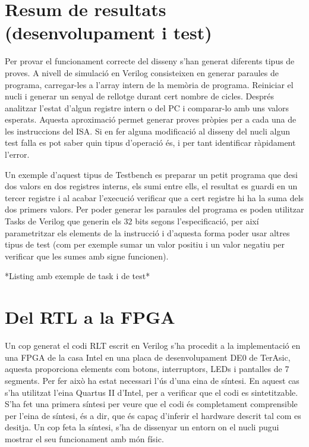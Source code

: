 \documentclass[10pt,a4paper,twocolumn,twoside]{article}
\begin{document}
    
        
        


\section{Resum de resultats (desenvolupament i test)}

Per provar el funcionament correcte del disseny s'han generat diferents tipus de proves.
A nivell de simulació en Verilog consisteixen en generar paraules de programa, carregar-les a l'array intern de la memòria de programa. Reiniciar el nucli i generar un senyal de rellotge durant cert nombre de cicles. Després analitzar l'estat d'algun registre intern o del PC i comparar-lo amb uns valors esperats. Aquesta aproximació permet generar proves pròpies per a cada una de les instruccions del ISA. Si en fer alguna modificació al disseny del nucli algun test falla es pot saber quin tipus d'operació és, i per tant identificar ràpidament l'error.

Un exemple d'aquest tipus de Testbench es preparar un petit programa que desi dos valors en dos registres interns, els sumi entre ells, el resultat es guardi en un tercer registre i al acabar l'execució verificar que a cert registre hi ha la suma dels dos primers valors. Per poder generar les paraules del programa es poden utilitzar Tasks de Verilog que generin els 32 bits segons l'especificació, per així parametritzar els elements de la instrucció i d'aquesta forma poder usar altres tipus de test (com per exemple sumar un valor positiu i un valor negatiu per verificar que les sumes amb signe funcionen). 

*Listing amb exemple de task i de test*


\section{Del RTL a la FPGA}  %
Un cop generat el codi RLT escrit en Verilog s’ha procedit a la implementació en una FPGA de la casa Intel en una placa de desenvolupament DE0 de TerAsic, aquesta proporciona elements com botons, interruptors, LEDs i pantalles de 7 segments. Per fer això ha estat necessari l'ús d'una eina de síntesi. En aquest cas s’ha utilitzat l'eina Quartus II d'Intel, per a verificar que el codi es sintetitzable. S’ha fet una primera síntesi per veure que el codi és completament comprensible per l’eina de síntesi, és a dir, que és capaç d’inferir el hardware descrit tal com es desitja. 
Un cop feta la síntesi, s'ha de dissenyar un entorn on el nucli pugui mostrar el seu funcionament amb món físic.
\end{document}

